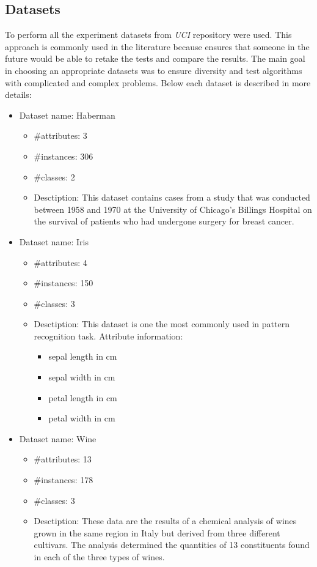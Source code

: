 \subsection{Datasets}
\label{cha:Datasets}
To perform all the experiment datasets from \textit{UCI} repository were used.
This approach is commonly used in the literature because ensures that someone
in the future would be able to retake the tests and compare the results. The
main goal in choosing an appropriate datasets was to ensure diversity and test
algorithms with complicated and complex problems. Below each dataset is
described in more details:
\begin{itemize}
    \item Dataset name: Haberman
        \begin{itemize} 
            \item \#attributes: 3
            \item \#instances: 306
            \item \#classes: 2
            \item Desctiption:
                This dataset contains cases from a study that was conducted
                between 1958 and 1970 at the University of Chicago's Billings Hospital 
                on the survival of patients who had undergone surgery for breast cancer.
        \end{itemize}
    \item Dataset name: Iris
        \begin{itemize}
            \item \#attributes: 4
            \item \#instances: 150
            \item \#classes: 3
            \item Desctiption:
                This dataset is one the most commonly used in
                pattern recognition task. Attribute information:
                \begin{itemize}
                    \item sepal length in cm 
                    \item sepal width in cm 
                    \item petal length in cm 
                    \item petal width in cm 
                \end{itemize}
        \end{itemize} 
    \item Dataset name: Wine
        \begin{itemize}
            \item \#attributes: 13
            \item \#instances: 178
            \item \#classes: 3
            \item Desctiption:
                These data are the results of a chemical analysis of wines
                grown in the same region in Italy but derived from three 
                different cultivars. The analysis determined the quantities 
                of 13 constituents found in each of the three types of wines. 
        \end{itemize}


\end{itemize}
